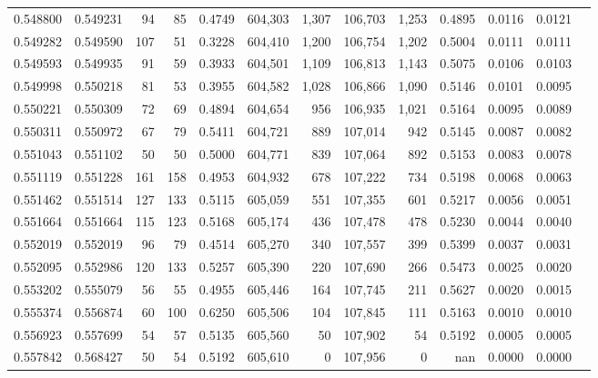 \begin{tabular}{rrrrrrrrrrrrr}
0.548800 & 0.549231 &    94 &    85 &                                     0.4749 & 604,303 &   1,307 & 106,703 &   1,253 & 0.4895 & 0.0116 & 0.0121 \\
0.549282 & 0.549590 &   107 &    51 &                                     0.3228 & 604,410 &   1,200 & 106,754 &   1,202 & 0.5004 & 0.0111 & 0.0111 \\
0.549593 & 0.549935 &    91 &    59 &                                     0.3933 & 604,501 &   1,109 & 106,813 &   1,143 & 0.5075 & 0.0106 & 0.0103 \\
0.549998 & 0.550218 &    81 &    53 &                                     0.3955 & 604,582 &   1,028 & 106,866 &   1,090 & 0.5146 & 0.0101 & 0.0095 \\
0.550221 & 0.550309 &    72 &    69 &                                     0.4894 & 604,654 &     956 & 106,935 &   1,021 & 0.5164 & 0.0095 & 0.0089 \\
0.550311 & 0.550972 &    67 &    79 &                                     0.5411 & 604,721 &     889 & 107,014 &     942 & 0.5145 & 0.0087 & 0.0082 \\
0.551043 & 0.551102 &    50 &    50 &                                     0.5000 & 604,771 &     839 & 107,064 &     892 & 0.5153 & 0.0083 & 0.0078 \\
0.551119 & 0.551228 &   161 &   158 &                                     0.4953 & 604,932 &     678 & 107,222 &     734 & 0.5198 & 0.0068 & 0.0063 \\
0.551462 & 0.551514 &   127 &   133 &                                     0.5115 & 605,059 &     551 & 107,355 &     601 & 0.5217 & 0.0056 & 0.0051 \\
0.551664 & 0.551664 &   115 &   123 &                                     0.5168 & 605,174 &     436 & 107,478 &     478 & 0.5230 & 0.0044 & 0.0040 \\
0.552019 & 0.552019 &    96 &    79 &                                     0.4514 & 605,270 &     340 & 107,557 &     399 & 0.5399 & 0.0037 & 0.0031 \\
0.552095 & 0.552986 &   120 &   133 &                                     0.5257 & 605,390 &     220 & 107,690 &     266 & 0.5473 & 0.0025 & 0.0020 \\
0.553202 & 0.555079 &    56 &    55 &                                     0.4955 & 605,446 &     164 & 107,745 &     211 & 0.5627 & 0.0020 & 0.0015 \\
0.555374 & 0.556874 &    60 &   100 &                                     0.6250 & 605,506 &     104 & 107,845 &     111 & 0.5163 & 0.0010 & 0.0010 \\
0.556923 & 0.557699 &    54 &    57 &                                     0.5135 & 605,560 &      50 & 107,902 &      54 & 0.5192 & 0.0005 & 0.0005 \\
0.557842 & 0.568427 &    50 &    54 &                                     0.5192 & 605,610 &       0 & 107,956 &       0 &    nan & 0.0000 & 0.0000 \\
\bottomrule
\end{tabular}
